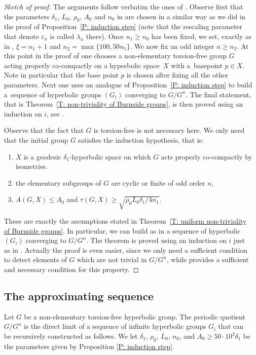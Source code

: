 \begin{proof}[Sketch of proof]
The arguments follow verbatim the ones of \cite[\S 4]{coulon_detecting_2018}.
Observe first that the parameters $\delta_1$, $L_0$, $\rho_0$, $A_0$ and $n_0$ in \cite[p.\,797]{coulon_detecting_2018} are chosen in a similar way as we did in the proof of Proposition~\ref{P: induction step} (note that the rescaling parameter that denote $\varepsilon_n$ is called $\lambda_n$ there).
Once $n_1 \geq n_0$ has been fixed, we set, exactly as in \cite[p.\,797]{coulon_detecting_2018}, $\xi = n_1 + 1$ and $n_2 = \max\{100, 50n_1\}$.
We now fix an odd integer $n \geq n_2$.
At this point in the proof of \cite{coulon_detecting_2018} one chooses a non-elementary torsion-free group $G$ acting properly co-compactly on a hyperbolic space~$X$ with a~basepoint $p \in X$.
Note in particular that the base point $p$ is chosen after fixing all the other parameters.
Next one uses an analogue of Proposition~\ref{P: induction step} to build a~sequence of hyperbolic groups $(G_i)$ converging to $G/G^n$.
The final statement, that is Theorem~\ref{T: non-triviality of Burnside groups}, is then proved using an induction on $i$, see \cite[Prop.\,4.6]{coulon_detecting_2018}.

Observe that the fact that $G$ is torsion-free is not necessary here.
We only need that the initial group $G$ satisfies the induction hypothesis, that is:
\begin{enumerate}
\item $X$ is a geodesic $\delta_1$-hyperbolic space on which $G$ acts properly co-compactly by isometries.
\item the elementary subgroups of $G$ are cyclic or finite of odd order $n$,
\item $A(G,X)\leqslant A_0$ and $\tau(G,X)\geqslant \sqrt{\rho_0 L_0 \delta_1/4n_1}$.
\end{enumerate}
These are exactly the assumptions stated in Theorem~\ref{T: uniform non-triviality of Burnside groups}.
In particular, we can build as in \cite{coulon_detecting_2018} a sequence of hyperbolic $(G_i)$ converging to $G/G^n$.
The theorem is proved using an induction on $i$ just as in \cite{coulon_detecting_2018}.
Actually the proof is even easier, since we only need a sufficient condition to detect elements of $G$ which are not trivial in $G/G^n$, while \cite{coulon_detecting_2018} provides a sufficient and necessary condition for this property.
\end{proof}

\subsection{The approximating sequence}
Let $G$ be a non-elementary torsion-free hyperbolic group.
The periodic quotient $G/G^n$ is the direct limit of a sequence of infinite hyperbolic groups $G_i$ that can be recursively constructed as follows.
We let $\delta_1$, $\rho_0$, $L_0$, $n_0$, and $A_0 \geq 50\cdot 10^3\delta_1$ be the parameters given by Proposition \ref{P: induction step}.

